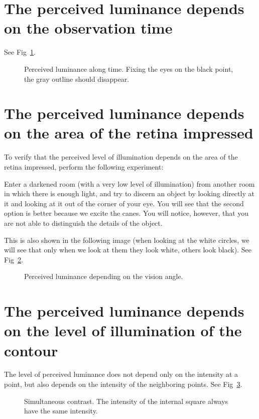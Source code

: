 \section{The perceived luminance depends on the observation time}

See Fig~\ref{fig:perceived_luminance_along_time}.

\begin{figure}
  \caption{Perceived luminance along time. Fixing the eyes on the black point, the gray outline should disappear.} %
  \label{fig:perceived_luminance_along_time}
\end{figure}

\section{The perceived luminance depends on the area of the retina impressed}
To verify that the perceived level of illumination depends on the area
of the retina impressed, perform the following experiment:

Enter a darkened room (with a very low level of illumination) from another room in which there is enough light, and try to discern an object by looking directly at it and looking at it out of the corner of your eye. You will see that the second option is better because we excite the canes. You will notice, however, that you are not able to distinguish the details of the object.

This is also shown in the following image (when looking at the white circles, we will see that only when we look at them they look white, others look black). See Fig~\ref{fig:perceived_luminance_vs_angle}.

\begin{figure}
  \caption{Perceived luminance depending on the vision angle.} %
  \label{fig:perceived_luminance_vs_angle}
\end{figure}

\section{The perceived luminance depends on the level of illumination of the contour}

The level of perceived luminance does not depend only on the intensity at a point, but also depends on the intensity of the neighboring points. See Fig~\ref{fig:simultaneous_contrast}.

\begin{figure}
  \caption{Simultaneous contrast. The intensity of the internal square always have the same intensity.} %
  \label{fig:simultaneous_contrast}
\end{figure}

